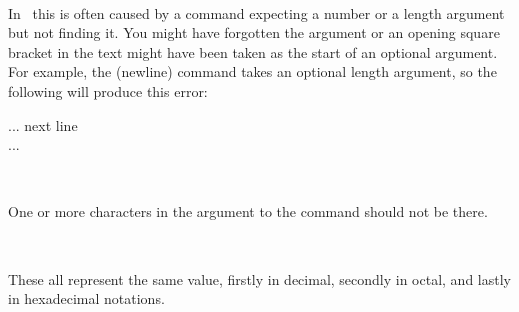 \begin{plainlist}

\item[\textmess{!}]
     \\

    In \ltx\ this is often caused by a command expecting a number or a length
argument but not finding it. You might have forgotten the argument or
an opening square bracket in the text might have been taken as the start
of an optional argument. For example, the \cmd{\\} (newline) command takes 
an optional length argument, so the following will produce this error:
\begin{lcode}
... next line\\
[Horatio:] ...
\end{lcode}
                         
\item[\textmess{!}] 
     \\

    One or more characters in the argument to the \cmd{\hyphenation} command
    should not be there.



\item[\textmess{!}] 
     \\

    These all represent the
      same value, firstly in decimal, secondly in octal, and lastly in
      hexadecimal notations.

\item[\textmess{!}]
      \\


\end{plainlist}
